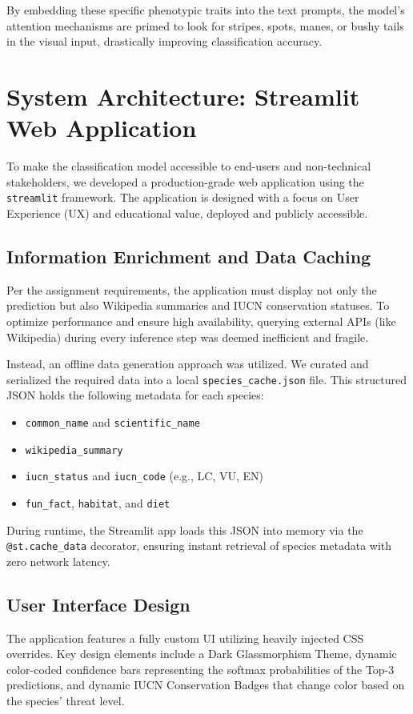\documentclass[11pt]{article}
\begin{document}
By embedding these specific phenotypic traits into the text prompts, the model's attention mechanisms are primed to look for stripes, spots, manes, or bushy tails in the visual input, drastically improving classification accuracy.

\section{System Architecture: Streamlit Web Application}

To make the classification model accessible to end-users and non-technical stakeholders, we developed a production-grade web application using the \texttt{streamlit} framework. The application is designed with a focus on User Experience (UX) and educational value, deployed and publicly accessible.

\subsection{Information Enrichment and Data Caching}
Per the assignment requirements, the application must display not only the prediction but also Wikipedia summaries and IUCN conservation statuses. To optimize performance and ensure high availability, querying external APIs (like Wikipedia) during every inference step was deemed inefficient and fragile.

Instead, an offline data generation approach was utilized. We curated and serialized the required data into a local \texttt{species\_cache.json} file. This structured JSON holds the following metadata for each species:
\begin{itemize}
    \item \texttt{common\_name} and \texttt{scientific\_name}
    \item \texttt{wikipedia\_summary}
    \item \texttt{iucn\_status} and \texttt{iucn\_code} (e.g., LC, VU, EN)
    \item \texttt{fun\_fact}, \texttt{habitat}, and \texttt{diet}
\end{itemize}
During runtime, the Streamlit app loads this JSON into memory via the \texttt{@st.cache\_data} decorator, ensuring instant retrieval of species metadata with zero network latency.

\subsection{User Interface Design}
The application features a fully custom UI utilizing heavily injected CSS overrides. Key design elements include a Dark Glassmorphism Theme, dynamic color-coded confidence bars representing the softmax probabilities of the Top-3 predictions, and dynamic IUCN Conservation Badges that change color based on the species' threat level.
\end{document}
